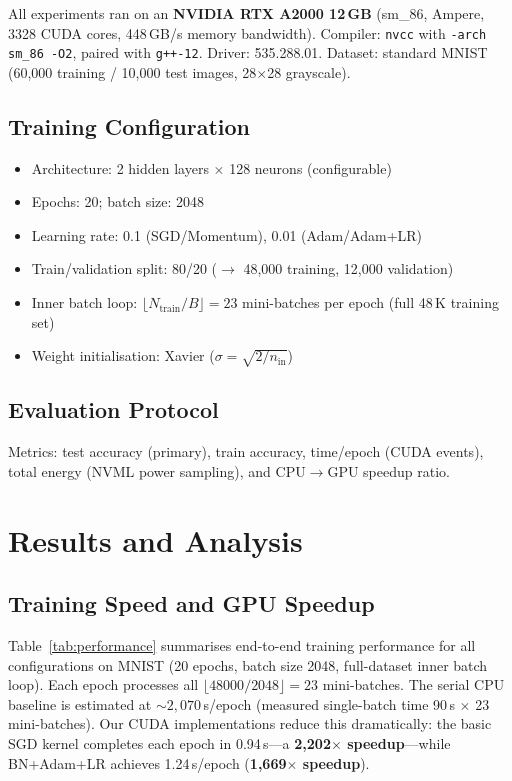 \documentclass[conference]{IEEEtran}
\begin{document}
All experiments ran on an \textbf{NVIDIA RTX A2000 12\,GB} (sm\_86, Ampere, 3328 CUDA cores, 448\,GB/s memory bandwidth). Compiler: \texttt{nvcc} with \texttt{-arch sm\_86 -O2}, paired with \texttt{g++-12}. Driver: 535.288.01. Dataset: standard MNIST~\cite{b1} (60,000 training / 10,000 test images, 28$\times$28 grayscale).

\subsection{Training Configuration}

\begin{itemize}
  \item Architecture: 2 hidden layers $\times$ 128 neurons (configurable)
  \item Epochs: 20; batch size: 2048
  \item Learning rate: 0.1 (SGD/Momentum), 0.01 (Adam/Adam+LR)
  \item Train/validation split: 80/20 ($\rightarrow$ 48,000 training, 12,000 validation)
  \item Inner batch loop: $\lfloor N_\text{train} / B \rfloor = 23$ mini-batches per epoch (full 48\,K training set)
  \item Weight initialisation: Xavier ($\sigma = \sqrt{2/n_\text{in}}$)
\end{itemize}

\subsection{Evaluation Protocol}

Metrics: test accuracy (primary), train accuracy, time/epoch (CUDA events), total energy (NVML power sampling), and CPU$\to$GPU speedup ratio.

\section{Results and Analysis}

\subsection{Training Speed and GPU Speedup}

Table~\ref{tab:performance} summarises end-to-end training performance for all configurations on MNIST (20 epochs, batch size 2048, full-dataset inner batch loop). Each epoch processes all $\lfloor 48000/2048 \rfloor = 23$ mini-batches. The serial CPU baseline is estimated at $\sim\!2{,}070$\,s/epoch (measured single-batch time 90\,s $\times$ 23 mini-batches). Our CUDA implementations reduce this dramatically: the basic SGD kernel completes each epoch in 0.94\,s—a \textbf{2{,}202$\times$ speedup}—while BN+Adam+LR achieves 1.24\,s/epoch (\textbf{1{,}669$\times$ speedup}).
\end{document}
